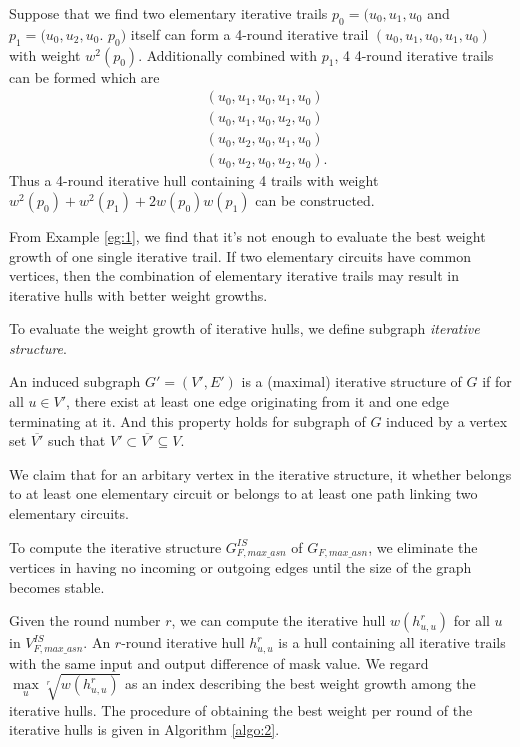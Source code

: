 \begin{example}\label{eg:1}
	Suppose that we find two elementary iterative trails $p_0=(u_0,u_1,u_0$ and $p_1=(u_0,u_2 ,u_0$. $p_0)$ itself can form a 4-round iterative trail $(u_0,u_1,u_0,u_1,u_0)$ with weight $w^2(p_0)$. Additionally combined with $p_1$, 4 4-round iterative trails can be formed which are
	\begin{align*}
		&(u_0,u_1,u_0,u_1,u_0)\\
		&(u_0,u_1,u_0,u_2,u_0)\\
		&(u_0,u_2,u_0,u_1,u_0)\\
		&(u_0,u_2,u_0,u_2,u_0).
	\end{align*}
	Thus a 4-round iterative hull containing 4 trails with weight $w^2(p_0)+w^2(p_1)+2w(p_0)w(p_1)$ can be constructed.
\end{example}

From Example \ref{eg:1}, we find that it's not enough to evaluate the best weight growth of one single iterative trail. If two elementary circuits have common vertices, then the combination of elementary iterative trails may result in iterative hulls with better weight growths.  

To evaluate the weight growth of iterative hulls, we define subgraph \textit{iterative structure}. 

\begin{definition}
	An induced subgraph $G'=(V',E')$ is a (maximal) iterative structure of $G$ if for all $u\in V'$, there exist at least one edge originating from it and one edge terminating at it. And this property holds for subgraph of $G$ induced by a vertex set $\overline{V'}$ such that $V' \subset \overline{V'} \subseteq V$.
\end{definition}

We claim that for an arbitary vertex in the iterative structure, it whether belongs to at least one elementary circuit or belongs to at least one path linking two elementary circuits. 

To compute the iterative structure $G^{IS}_{F,max\_asn}$ of $G_{F,max\_asn}$, we eliminate the vertices in having no incoming or outgoing edges until the size of the graph becomes stable. 

Given the round number $r$, we can compute the iterative hull $w(h_{u,u}^r)$ for all $u$ in $V^{IS}_{F,max\_asn}$. An $r$-round iterative hull $h_{u,u}^r$ is a hull containing all iterative trails with the same input and output difference of mask value. We regard $\max\limits_{u}\sqrt[r]{w(h_{u,u}^r)}$ as an index describing the best weight growth among the iterative hulls. The procedure of obtaining the best weight per round of the iterative hulls is given in Algorithm \ref{algo:2}.


